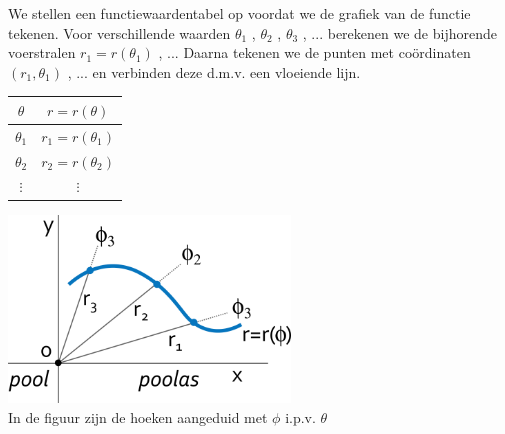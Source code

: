 We stellen een functiewaardentabel op voordat we de grafiek
van de functie tekenen. Voor verschillende waarden $\theta_{1}$ ,
$\theta_{2}$ , $\theta_{3}$ , ... berekenen we de bijhorende voerstralen
$r_{1}=r\left(\theta_{1}\right)$ , ... Daarna tekenen we de punten
met co\"ordinaten $\left(r_{1},\theta_{1}\right)$ , ... en verbinden
deze d.m.v. een vloeiende lijn.

\begin{minipage}{.48\linewidth}
	\centering
	\begin{tabular}{c|c}
		$\theta$ & $r=r(\theta)$\\
		\hline 
		$\theta_{1}$ & $r_{1}=r\left(\theta_{1}\right)$ \\
		$\theta_{2}$ & $r_{2}=r\left(\theta_{2}\right)$ \\
		$\vdots$ & $\vdots$\\
	\end{tabular}
\end{minipage}
\begin{minipage}{.48\linewidth}
\includegraphics[height=5cm]{2_elem_rekenvaardigheden_B/inputs/figuur11}\\
In de figuur zijn de hoeken aangeduid met $\phi$ i.p.v. $\theta$
\end{minipage}



